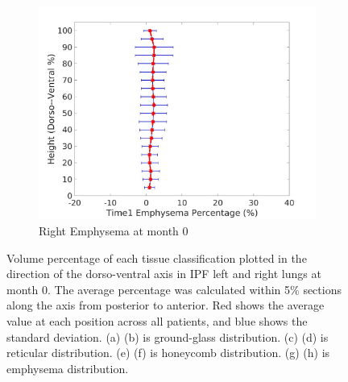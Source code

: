 \begin{figure}[H]
\begin{subfigure}{.42\linewidth}
  \includegraphics[width=\linewidth,trim={{.0\wd0} {.0\wd0} {.0\wd0} {.0\wd0}},clip]{QuantitativeAnalysis/Image/RightLungEmphysemaDiseaseDorsoToVentralTime1.jpg}
  \caption{Right Emphysema at month 0}
  \label{fig:DiseaseDorsoToVentralTime1-h}
\end{subfigure}
\caption{Volume percentage of each tissue classification plotted in the direction of the dorso-ventral axis in IPF left and right lungs at month 0. The average percentage was calculated within 5\% sections along the axis from posterior to anterior. Red shows the average value at each position across all patients, and blue shows the standard deviation. (a) (b) is ground-glass distribution. (c) (d) is reticular distribution. (e) (f) is honeycomb distribution. (g) (h) is emphysema distribution.}
\label{fig:DiseaseDorsoToVentralTime1}
\end{figure}

